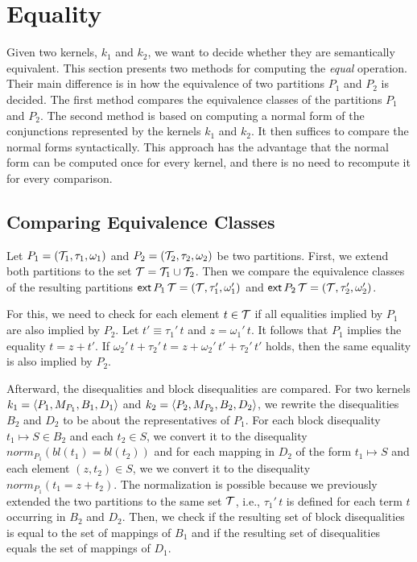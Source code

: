 \section{Equality}

Given two kernels, $k_1$ and $k_2$, we want to decide whether they are semantically equivalent.
This section presents two methods for computing the \emph{equal} operation.
Their main difference is in how the equivalence of two partitions $P_1$ and $P_2$ is decided.
The first method compares the equivalence classes of the partitions $P_1$ and $P_2$.
The second method is based on computing a normal form of the conjunctions represented by the kernels $k_1$ and $k_2$.
It then suffices to compare the normal forms syntactically.
This approach has the advantage that the normal form can be computed once for every kernel, and there is no need to recompute it for every comparison.

\subsection{Comparing Equivalence Classes}

Let $P_1 = (\mathcal{T}_1, \tau_1, \omega_1)$ and $P_2 = (\mathcal{T}_2, \tau_2, \omega_2)$ be two partitions.
First, we extend both partitions to the set $\mathcal{T} = \mathcal{T}_1 \cup \mathcal{T}_2$.
Then we compare the equivalence classes of the resulting partitions $\textsf{ext}\,{P_1}\,{\mathcal{T}} = (\mathcal{T}, \tau_1', \omega_1')$ and $\textsf{ext}\,{P_2}\,{\mathcal{T}} = (\mathcal{T}, \tau_2', \omega_2')$.

For this, we need to check for each element $t \in \mathcal{T}$ if all equalities implied by $P_1$ are also implied by $P_2$.
Let $t' \equiv \tau_1'\,t$ and $z = \omega_1'\,t$.
It follows that $P_1$ implies the equality $t = z + t'$.
If $\omega_2'\,t + \tau_2'\,t = z + \omega_2'\,t' + \tau_2'\,t'$ holds, then the same equality is also implied by $P_2$.

Afterward, the disequalities and block disequalities are compared.
For two kernels $k_1 = \langle P_1, M_{P_1}, B_1, D_1\rangle$ and $k_2 = \langle P_2, M_{P_2}, B_2, D_2\rangle$,
we rewrite the disequalities $B_2$ and $D_2$ to be about the representatives of $P_1$.
For each block disequality $t_1 \mapsto S \in B_2$ and each $t_2 \in S$, we convert it to the disequality $norm_{P_1}(bl(t_1) = bl(t_2))$ and for each mapping in $D_2$ of the form $t_1 \mapsto S$ and each element $(z, t_2) \in S$, we we convert it to the disequality $norm_{P_1}(t_1 = z + t_2)$.
The normalization is possible because we previously extended the two partitions to the same set $\mathcal{T}$, i.e., $\tau_1'\,t$ is defined for each term $t$ occurring in $B_2$ and $D_2$.
Then, we check if the resulting set of block disequalities is equal to the set of mappings of $B_1$ and if the resulting set of disequalities equals the set of mappings of $D_1$.

